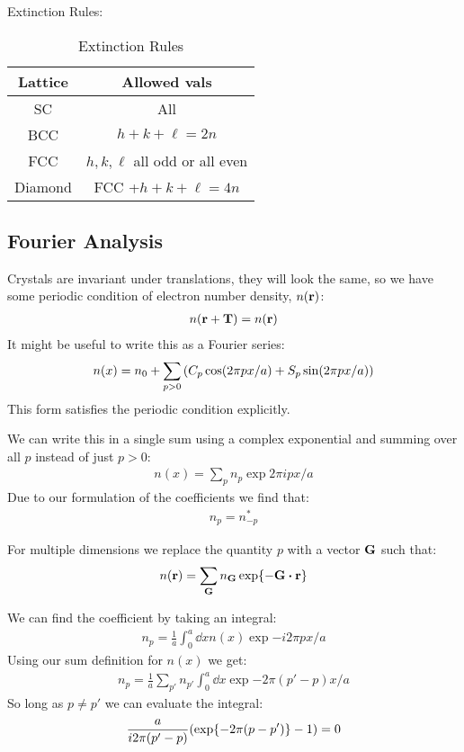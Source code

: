 \documentclass[12pt]{article}
\begin{document}
Extinction Rules:
\begin{table}[H]
  \centering
  \begin{tabular}{c|c}
    Lattice & Allowed vals \\ \hline
    SC & All \\
    BCC & $h+k+\ell=2n$ \\
    FCC & $h,k,\ell$ all odd or all even \\
    Diamond & FCC +$h+k+\ell=4n$
  \end{tabular}
  \caption{Extinction Rules}
\end{table}

\subsection{Fourier Analysis}
Crystals are invariant under translations, they will look the same, so we have some periodic condition of electron number density, $n(\vb{r})$:
\begin{align*}
  n(\vb{r+T})=n(\vb{r})
\end{align*}
It might be useful to write this as a Fourier series:
\begin{align*}
  n(x)=n_0+\sum_{p>0}\qty(C_p\cos(2\pi px/a)+S_p\sin(2\pi px/a))
\end{align*}
This form satisfies the periodic condition explicitly.

We can write this in a single sum using a complex exponential and summing over all $p$ instead of just $p>0$:
\begin{align*}
  n(x)=\sum_pn_p\exp{2\pi ipx/a}
\end{align*}
Due to our formulation of the coefficients we find that:
\begin{align*}
  n_p=n^*_{-p}
\end{align*}

For multiple dimensions we replace the quantity $p$ with a vector $\vb{G}$ such that:
\begin{align*}
  n(\vb{r})=\sum_{\vb{G}}n_{\vb{G}}\exp{-\vb{G}\vdot\vb{r}}
\end{align*}

We can find the coefficient by taking an integral:
\begin{align*}
  n_p=\frac{1}{a}\int_0^a\dd{x}n(x)\exp{-i2\pi px/a}
\end{align*}
Using our sum definition for $n(x)$ we get:
\begin{align*}
  n_p=\frac{1}{a}\sum_{p'}n_{p'}\int_0^a\dd{x}\exp{-2\pi(p'-p)x/a}
\end{align*}
So long as $p\neq p'$ we can evaluate the integral:
\begin{align*}
  \frac{a}{i2\pi(p'-p)}\qty(\exp{-2\pi(p-p')}-1)=0
\end{align*}
\end{document}
